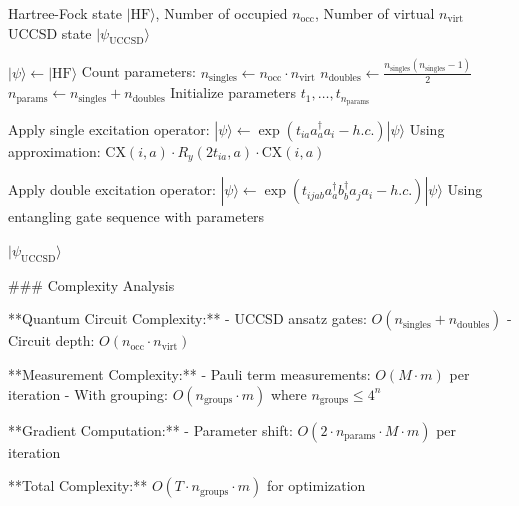 \begin{algorithm}
\caption{UCCSD Ansatz with Single and Double Excitations}
\begin{algorithmic}[1]
\REQUIRE Hartree-Fock state $|\text{HF}\rangle$, Number of occupied $n_{\text{occ}}$, Number of virtual $n_{\text{virt}}$
\ENSURE UCCSD state $|\psi_\text{UCCSD}\rangle$

\STATE $|\psi\rangle \gets |\text{HF}\rangle$
\STATE Count parameters: $n_{\text{singles}} \gets n_{\text{occ}} \cdot n_{\text{virt}}$
\STATE $n_{\text{doubles}} \gets \frac{n_{\text{singles}}(n_{\text{singles}}-1)}{2}$
\STATE $n_{\text{params}} \gets n_{\text{singles}} + n_{\text{doubles}}$
\STATE Initialize parameters $t_1, \ldots, t_{n_{\text{params}}}$

        \STATE Apply single excitation operator:
        \STATE \quad $|\psi\rangle \gets \exp(t_{ia} a^\dagger_a a_i - h.c.) |\psi\rangle$
        \STATE \quad Using approximation: CX$(i,a) \cdot R_y(2t_{ia}, a) \cdot$CX$(i,a)$
    \ENDFOR
\ENDFOR

                \STATE Apply double excitation operator:
                \STATE \quad $|\psi\rangle \gets \exp(t_{ijab} a^\dagger_a b^\dagger_b a_j a_i - h.c.) |\psi\rangle$
                \STATE \quad Using entangling gate sequence with parameters
            \ENDFOR
        \ENDFOR
    \ENDFOR
\ENDFOR

\RETURN $|\psi_\text{UCCSD}\rangle$
\end{algorithmic}
\end{algorithm}

### Complexity Analysis

**Quantum Circuit Complexity:**
- UCCSD ansatz gates: $O(n_{\text{singles}} + n_{\text{doubles}})$
- Circuit depth: $O(n_{\text{occ}} \cdot n_{\text{virt}})$

**Measurement Complexity:**
- Pauli term measurements: $O(M \cdot m)$ per iteration
- With grouping: $O(n_{\text{groups}} \cdot m)$ where $n_{\text{groups}} \leq 4^n$

**Gradient Computation:**
- Parameter shift: $O(2 \cdot n_{\text{params}} \cdot M \cdot m)$ per iteration

**Total Complexity:** $O(T \cdot n_{\text{groups}} \cdot m)$ for optimization

